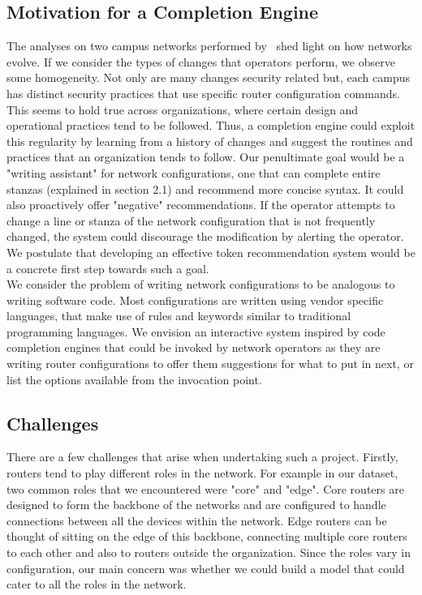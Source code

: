 \subsection{Motivation for a Completion Engine}

The analyses on two campus networks performed by~\cite{Kim} shed light on how networks evolve. If we consider the types of changes that operators perform, we observe some homogeneity. Not only are many changes security related but, each campus has distinct security practices that use specific router configuration commands. This seems to hold true across organizations, where certain design and operational practices tend to be followed. Thus, a completion engine could exploit this regularity by learning from a history of changes and suggest the routines and practices that an organization tends to follow. Our penultimate goal would be a "writing assistant" for network configurations, one that can complete entire stanzas (explained in section 2.1) and recommend more concise syntax. It could also proactively offer "negative" recommendations. If the operator attempts to change a line or stanza of the network configuration that is not frequently changed, the system could discourage the modification by alerting the operator. We postulate that developing an effective token recommendation system would be a concrete first step towards such a goal.\\

We consider the problem of writing network configurations to be analogous to writing software code. Most configurations are written using vendor specific languages, that make use of rules and keywords similar to traditional programming languages. We envision an interactive system inspired by code completion engines that could be invoked by network operators as they are writing router configurations to offer them suggestions for what to put in next, or list the options available from the invocation point. 

\subsection{Challenges}
There are a few challenges that arise when undertaking such a project. Firstly, routers tend to play different roles in the network. For example in our dataset, two common roles that we encountered were "core" and "edge". Core routers are designed to form the backbone of the networks and are configured to handle connections between all the devices within the network. Edge routers can be thought of sitting on the edge of this backbone, connecting multiple core routers to each other and also to routers outside the organization. Since the roles vary in configuration, our main concern was whether we could build a model that could cater to all the roles in the network.\\

